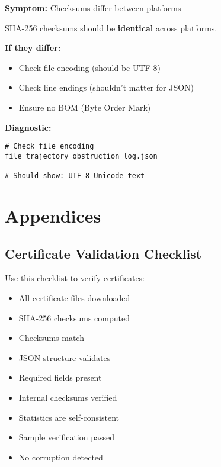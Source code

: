 \documentclass[11pt,a4paper]{article}
\theoremstyle{definition}
\newcommand{\file}[1]{\path{\detokenize{#1}}}
\begin{document}
\textbf{Symptom:} Checksums differ between platforms

\begin{infobox}[title={Important Note}]
SHA-256 checksums should be \textbf{identical} across platforms.
\end{infobox}

\textbf{If they differ:}
\begin{itemize}
    \item Check file encoding (should be UTF-8)
    \item Check line endings (shouldn't matter for JSON)
    \item Ensure no BOM (Byte Order Mark)
\end{itemize}

\textbf{Diagnostic:}

\begin{lstlisting}[style=bashstyle]
# Check file encoding
file trajectory_obstruction_log.json

# Should show: UTF-8 Unicode text
\end{lstlisting}

\section{Appendices}

\subsection{Certificate Validation Checklist}

Use this checklist to verify certificates:

\begin{itemize}[label=$\square$]
    \item All certificate files downloaded
    \item SHA-256 checksums computed
    \item Checksums match \file{checksums.txt}
    \item JSON structure validates
    \item Required fields present
    \item Internal checksums verified
    \item Statistics are self-consistent
    \item Sample verification passed
    \item No corruption detected
\end{itemize}
\end{document}
